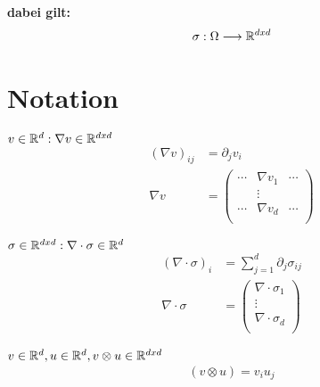 \begin{bemerkung}\textbf{dabei gilt:}
    \begin{align*}
        \sigma : \Omega \longrightarrow \mathbb{R}^{dxd}
    \end{align*}

\end{bemerkung}

\section{Notation}\label{sec:notation}
\begin{itemize}
    \begin{item}$v \in \mathbb{R}^{d} : \nabla v \in \mathbb{R}^{dxd}$
        \begin{align*}
         (\nabla v)_{ij} &= \partial_j v_i \\
         \nabla v &=    \begin{pmatrix} 
                            \cdots  & \nabla v_1    & \cdots    \\
                                    & \vdots        &           \\ 
                            \cdots  & \nabla v_d    & \cdots    \\
                        \end{pmatrix}
        \end{align*}
    \end{item}
    
    \begin{item}$\sigma \in \mathbb{R}^{dxd}  : \nabla \cdot \sigma \in \mathbb{R}^{d}$
        \begin{align*}
            (\nabla\cdot\sigma)_i &= \sum_{j=1}^{d} \partial_j\sigma_{ij} \\
            \nabla \cdot \sigma &=    \begin{pmatrix} 
                            \nabla \cdot \sigma_1   \\
                            \vdots                  \\ 
                            \nabla \cdot \sigma_d   \\
                        \end{pmatrix} 
        \end{align*}
    \end{item}
    
    \begin{item}$v \in \mathbb{R}^{d}, u \in \mathbb{R}^{d}, v \otimes u \in \mathbb{R}^{dxd}$
        \begin{align*}
            ( v \otimes u ) = v_i u_j \\
        \end{align*}
    \end{item}
    

\end{itemize}
